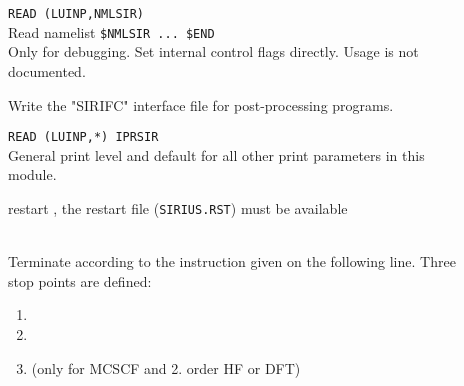 \begin{description}

\item[]
  \verb"READ (LUINP,NMLSIR)" \\
  Read namelist \verb"$NMLSIR ... $END" \\
  Only for debugging. Set internal control flags directly.
  Usage is not documented.

\item[]
  Write the "SIRIFC" interface file for post-processing programs.


\item[]
  \verb"READ (LUINP,*) IPRSIR" \\
  General {\sir} print level and default for all other print parameters in this module.

\item[]
  restart {\sir},
  the {\sir} restart file (\verb|SIRIUS.RST|) must be available


\item[]
   \\
  Terminate {\sir} according to the instruction given on the following line.
  Three stop points are defined:
\begin{enumerate}

\item \hspace{2em} 

\item \hspace{2em} 

\item \hspace{2em}  (only for MCSCF and 2. order HF or DFT)
\end{enumerate}


\end{description}
